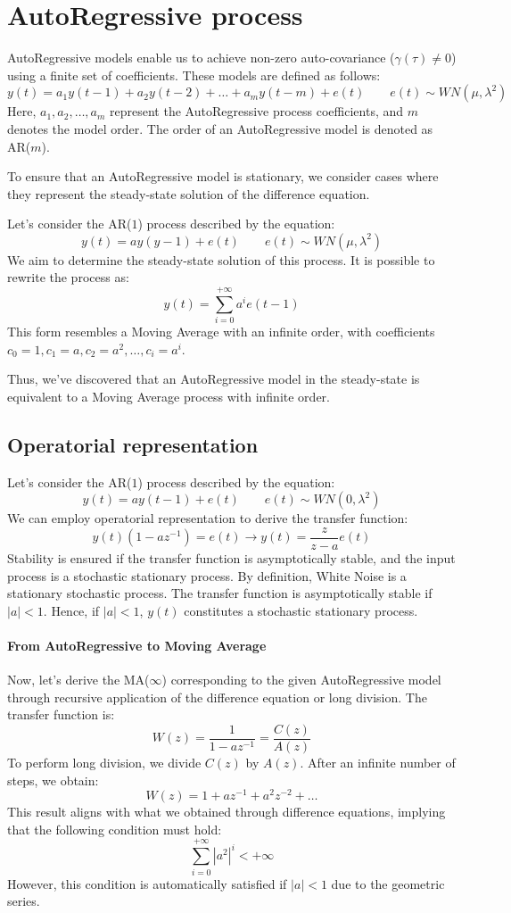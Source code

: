\section{AutoRegressive process}

AutoRegressive models enable us to achieve non-zero auto-covariance ($\gamma(\tau)\neq 0$) using a finite set of coefficients. 
These models are defined as follows:
\[y(t)=a_1y(t-1)+a_2y(t-2)+\dots+a_m y(t-m)+e(t) \qquad e(t)\sim WN(\mu,\lambda^2)\]
Here, $a_1,a_2,\dots,a_m$ represent the AutoRegressive process coefficients, and $m$ denotes the model order. 
The order of an AutoRegressive model is denoted as AR($m$).

To ensure that an AutoRegressive model is stationary, we consider cases where they represent the steady-state solution of the difference equation.
\begin{example}
    Let's consider the AR($1$) process described by the equation:
    \[y(t)=ay(y-1)+e(t)\qquad e(t) \sim WN(\mu,\lambda^2)\]
    We aim to determine the steady-state solution of this process. 
    It is possible to rewrite the process as:
    \[y(t)=\sum_{i=0}^{+\infty}a^i e(t-1)\]
    This form resembles a Moving Average with an infinite order, with coefficients  $c_0=1,c_1=a,c_2=a^2,\dots,c_i=a^i$. 
\end{example}
Thus, we've discovered that an AutoRegressive model in the steady-state is equivalent to a Moving Average process with infinite order.

\subsection{Operatorial representation}
Let's consider the AR($1$) process described by the equation:
\[y(t)=ay(t-1)+e(t) \qquad e(t)\sim WN(0,\lambda^2)\]
We can employ operatorial representation to derive the transfer function:
\[y(t)\left( 1 -az^{-1} \right)=e(t) \rightarrow y(t)=\dfrac{z}{z-a}e(t)\]
Stability is ensured if the transfer function is asymptotically stable, and the input process is a stochastic stationary process.
By definition,  White Noise is a stationary stochastic process. 
The transfer function is asymptotically stable if $\left\lvert a \right\rvert<1$.
Hence, if $\left\lvert a \right\rvert<1$, $y(t)$ constitutes a stochastic stationary process.
\paragraph*{From AutoRegressive to Moving Average}
Now, let's derive the MA($\infty$) corresponding to the given AutoRegressive model through recursive application of the difference equation or long division. 
The transfer function is:
\[W(z)=\dfrac{1}{1-az^{-1}}=\dfrac{C(z)}{A(z)}\]
To perform long division, we divide $C(z)$ by $A(z)$. 
After an infinite number of steps, we obtain:
\[W(z)=1+az^{-1}+a^2z^{-2}+\dots\]
This result aligns with what we obtained through difference equations, implying that the following condition must hold:
\[\sum_{i=0}^{+\infty} \left\lvert a^2 \right\rvert^i<+\infty \]
However, this condition is automatically satisfied if $\left\lvert a \right\rvert<1$ due to the geometric series.

